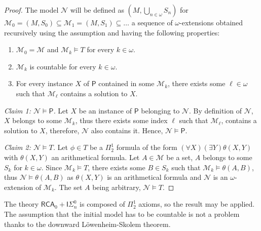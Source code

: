 \documentclass{article}
\def\N{\mathcal{N}}
\def\M{\mathcal{M}}
\def\Psf{\mathsf{P}}
\newcommand{\ISig}{\mathsf{I}\Sigma^0}
\newcommand{\RCA}{\mathsf{RCA}}
\numberwithin{theorem}{section}
\theoremstyle{definition}
\begin{document}
\begin{proof}
The model $\N$ will be defined as $(M,\bigcup_{n \in \omega} S_n)$ for $\M_0 = (M,S_0) \subseteq \M_1 = (M,S_1) \subseteq \dots$ a sequence of $\omega$-extensions obtained recursively using the assumption and having the following properties:
\begin{enumerate}
    \item $\M_0 = \M$ and  $\M_k \models T$ for every $k \in \omega$. 
    \item $\M_k$ is countable for every $k \in \omega$. 
    \item For every instance $X$ of $\Psf$ contained in some $\M_k$, there exists some $\ell \in \omega$ such that $\M_{\ell}$ contains a solution to $X$.
\end{enumerate}
 

\emph{Claim 1: $\N \models \Psf$.} Let $X$ be an instance of $\Psf$ belonging to $\N$. By definition of $\N$, $X$ belongs to some $\M_k$, thus there exists some index $\ell$ such that $\M_{\ell}$, contains a solution to $X$, therefore, $\N$ also contains it. Hence, $\N \models \Psf$.

\emph{Claim 2: $\N \models T$.} Let $\phi \in T$ be a $\Pi_2^1$ formula of the form $(\forall X)(\exists Y)\theta(X,Y)$ with $\theta(X,Y)$ an arithmetical formula. Let $A \in \M$ be a set, $A$ belongs to some $S_k$ for $k \in \omega$. Since $\M_k \models T$, there exists some $B \in S_k$ such that $\M_k \models \theta(A,B)$, thus $\N \models \theta(A,B)$ as $\theta(X,Y)$ is an arithmetical formula and $\N$ is an $\omega$-extension of $\M_k$. The set $A$ being arbitrary, $\N \models T$.
\end{proof}

The theory $\RCA_0 + \ISig_n$ is composed of $\Pi_2^1$ axioms, so the result may be applied. The assumption that the initial model has to be countable is not a problem thanks to the downward L\"owenheim-Skolem theorem. 
\end{document}
